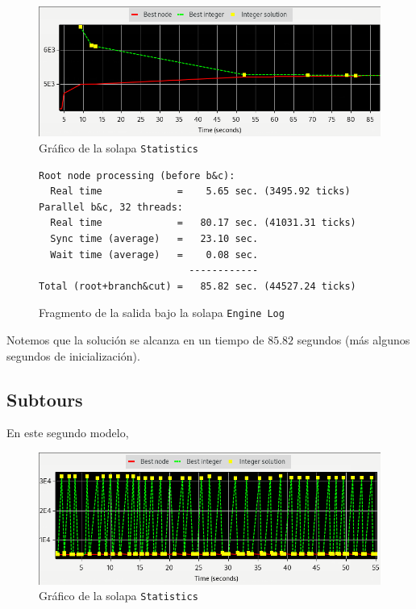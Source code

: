 \documentclass[titlepage,a4paper,oneside]{article}
\begin{document}
\begin{figure}[H]
\centering
\includegraphics[width=\textwidth]{images/MTZ.png}
\caption{Gráfico de la solapa \texttt{Statistics}}
\end{figure}

\begin{figure}[H]
\begin{verbatim}
Root node processing (before b&c):
  Real time             =    5.65 sec. (3495.92 ticks)
Parallel b&c, 32 threads:
  Real time             =   80.17 sec. (41031.31 ticks)
  Sync time (average)   =   23.10 sec.
  Wait time (average)   =    0.08 sec.
                          ------------
Total (root+branch&cut) =   85.82 sec. (44527.24 ticks)
\end{verbatim}
\caption{Fragmento de la salida bajo la solapa \texttt{Engine Log}}
\end{figure}

Notemos que la solución se alcanza en un tiempo de $85.82$ segundos (más algunos segundos de inicialización).

\subsection{Subtours}\label{Subtours}
En este segundo modelo,


\begin{figure}[H]
\centering
\includegraphics[width=\textwidth]{images/subtours.png}
\caption{Gráfico de la solapa \texttt{Statistics}}
\end{figure}
\end{document}
